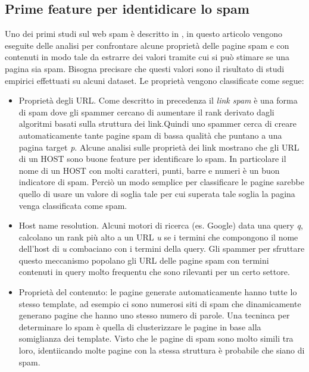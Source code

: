 \subsection{Prime feature per identidicare lo spam}
Uno dei primi studi sul web spam è descritto in \cite{Fetterly:2004:SDS:1017074.1017077}, in questo articolo vengono eseguite delle analisi per confrontare alcune proprietà delle pagine spam e con contenuti in modo tale da estrarre dei valori tramite cui si può stimare se una pagina sia spam. Bisogna precisare che questi valori sono il risultato di studi empirici effettuati su alcuni dataset. Le proprietà vengono classificate come segue:
\begin{itemize}
 \item 	Proprietà degli URL. Come descritto in precedenza il \textit{link spam} è una forma di spam dove gli spammer cercano di aumentare il rank derivato dagli algoritmi basati sulla struttura dei link.Quindi uno spammer cerca di creare automaticamente tante pagine spam di bassa qualità che puntano a una pagina target \textit{p}. Alcune analisi sulle proprietà dei link mostrano che gli URL di un HOST sono buone feature per identificare lo spam. In particolare il nome di un HOST con molti caratteri, punti, barre e numeri è un buon indicatore di spam. Perciò un modo semplice per classificare le pagine sarebbe quello di usare un valore di soglia tale per cui superata tale soglia la pagina venga classificata come spam. 
 
 \item Host name resolution. Alcuni motori di ricerca (es. Google) data una query \textit{q}, calcolano un rank più alto a un URL \textit{u} se i termini che compongono  il nome dell'host di \textit{u} combaciano con i termini della query. Gli spammer per sfruttare questo meccanismo popolano gli URL delle pagine spam con termini contenuti in query molto frequentu che sono rilevanti per un certo settore.
 
 \item Proprietà del contenuto: le pagine generate automaticamente hanno tutte lo stesso template, ad esempio ci sono numerosi siti di spam che dinamicamente generano pagine che hanno uno stesso numero di parole. Una tecninca per determinare lo spam è quella di clusterizzare le pagine in base alla somiglianza dei template. Visto che le pagine di spam sono molto simili tra loro, identiicando molte pagine con la stessa struttura è probabile che siano di spam.
\end{itemize}

